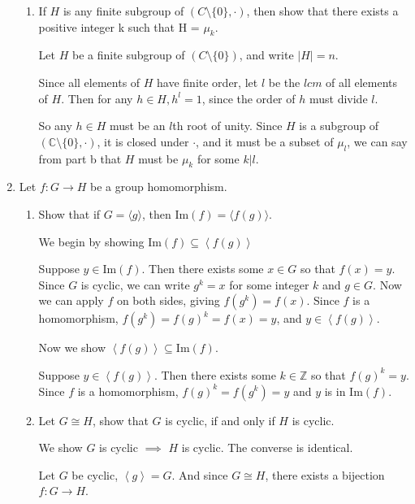 \documentclass{article}
\begin{document}
\begin{enumerate}
\begin{enumerate}[label= (\alph*)]
        \item If $H$ is any finite subgroup of $(C \setminus \{0\} , \cdot )$,
            then show that there exists a positive
            integer k such that H = $\mu_k$.

            Let $H$ be a finite subgroup of $(C \setminus \{0\})$, and write $|H|=n$.

            Since all elements of $H$ have finite order, let $l$ be the $lcm$ of all elements of $H$.
            Then for any $h\in H, h^{l}=1$, since the order of $h$ must divide $l$.

            So any $h\in H$ must be an $l$th root of unity. Since $H$ is a subgroup of 
            $(\mathbb{C}\setminus \{0\} ,\cdot )$, it is closed under $\cdot $,
            and it must be a subset of $\mu_l$, we can say from part b that $H$ must be $\mu_k$ for 
            some $k|l$.
    \end{enumerate}
\item Let $f : G \to H$ be a group homomorphism.
    \begin{enumerate}[label= (\alph*)] 
        \item Show that if $G = \langle g\rangle$, then $\mathrm{Im} (f) = \langle f (g)\rangle$.

            We begin by showing $\mathrm{Im}(f)\subseteq \left<f(g) \right>$

            Suppose $y\in \mathrm{Im}(f)$. Then there exists some $x\in G$
            so that $f(x)=y$. Since $G$ is cyclic, we can write $g^{k}=x$ 
            for some integer $k$ and $g\in G$. Now we can apply $f$
            on both sides, giving $f(g^{k})=f(x)$. Since $f$ is a homomorphism, 
            $f(g^{k})=f(g)^{k}=f(x)=y$, and $y\in \left<f(g) \right>$.

            Now we show $\left<f(g) \right>\subseteq \mathrm{Im}(f)$.

            Suppose $y\in \left<f(g) \right>$. Then there exists some $k\in \mathbb{Z}$ so that 
            $f(g)^{k}=y$. Since $f$ is a homomorphism, $f(g)^{k}=f(g^{k})=y$ and $y$ is in 
            $\mathrm{Im}(f)$.

        \item Let $G \cong H$, show that $G$ is cyclic, if and only if $H$ is cyclic.
            
            We show $G$ is cyclic $\implies$ $H$ is cyclic. The converse is identical.

            Let $G$ be cyclic, $\left<g \right>= G$.
            And since $G\cong H$, there exists a bijection $f:G\to H$. 


\end{enumerate}
\end{enumerate}
\end{document}

